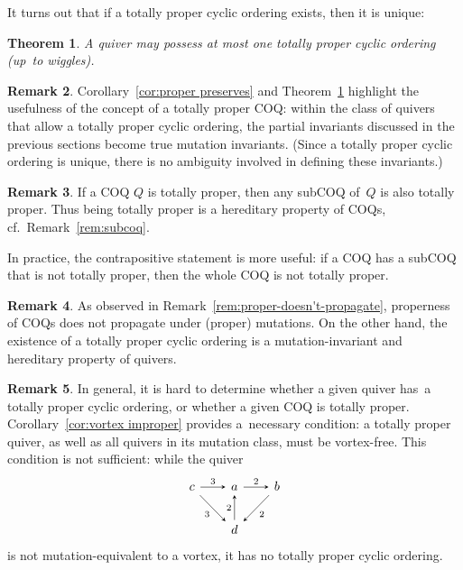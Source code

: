 \documentclass[11pt, letterpaper]{amsart}
\newtheorem{theorem}{Theorem}[section]
\theoremstyle{definition}
\newtheorem{remark}[theorem]{Remark}
\numberwithin{equation}{section}
\begin{document}
It turns out that if a totally proper cyclic ordering exists, then it is unique:

\begin{theorem}
\label{th:totally-proper-unique}
A quiver may possess at most one totally proper cyclic ordering (up~to wiggles). 
\end{theorem}


\begin{remark}
Corollary~\ref{cor:proper preserves} and Theorem~\ref{th:totally-proper-unique} 
highlight the usefulness of the concept of a totally proper COQ:
within the class of quivers that allow a totally proper cyclic ordering, 
the partial invariants discussed in the previous sections
become true mutation invariants.
(Since a totally proper cyclic ordering is unique, there is no ambiguity involved in defining these invariants.) 
\end{remark}

\begin{remark}
If a COQ $Q$ is totally proper, then any subCOQ of~$Q$ 
is also totally proper.
Thus being totally proper is a hereditary property of COQs, cf.\ Remark~\ref{rem:subcoq}.

In practice, the contrapositive statement is more useful: 
if a COQ has a subCOQ that is not totally proper, then the whole COQ is not totally proper.
\end{remark}

\begin{remark}
As observed in Remark~\ref{rem:proper-doesn't-propagate}, %
properness of COQs does not propagate under (proper) mutations.
On the other hand, the existence of a totally proper cyclic ordering is a mutation-invariant 
and hereditary property of quivers.
\end{remark}

\begin{remark}
\label{rem:testing-totally-proper}
In general, it is hard to determine whether a given quiver has~a totally proper cyclic ordering,
or whether a given COQ is totally proper.
Corollary~\ref{cor:vortex improper} provides a~necessary condition: 
a totally proper quiver, as well as all quivers in its mutation class, must be vortex-free.
This condition is not sufficient: while the quiver
\begin{equation*}
\begin{tikzcd}[arrows={-stealth}, sep=2em]
  c  \arrow[r,"3"] \arrow[rd,swap,"3"]  & a \arrow[r, "2"] & b \arrow[ld, "2"] \\
   & d   \arrow[u, "2"] 
\end{tikzcd}
\end{equation*}
is not mutation-equivalent to a vortex, 
it has no totally proper cyclic ordering. 
\end{remark}
\end{document}
